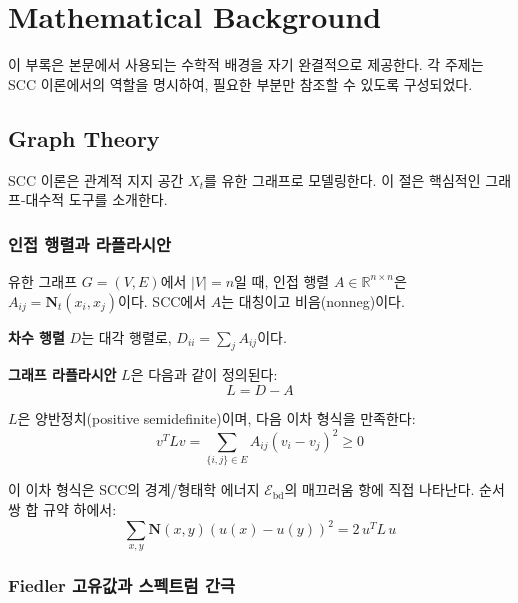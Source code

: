 
\chapter{Mathematical Background}
\label{app:math-background}

이 부록은 본문에서 사용되는 수학적 배경을 자기 완결적으로 제공한다. 각 주제는 SCC 이론에서의 역할을 명시하여, 필요한 부분만 참조할 수 있도록 구성되었다.


\section{Graph Theory}
\label{app:graph-theory}

SCC 이론은 관계적 지지 공간 $X_t$를 유한 그래프로 모델링한다. 이 절은 핵심적인 그래프-대수적 도구를 소개한다.


\subsection{인접 행렬과 라플라시안}

유한 그래프 $G = (V, E)$에서 $|V| = n$일 때, 인접 행렬 $A \in \mathbb{R}^{n \times n}$은 $A_{ij} = \mathbf{N}_t(x_i, x_j)$이다. SCC에서 $A$는 대칭이고 비음(nonneg)이다.

\textbf{차수 행렬} $D$는 대각 행렬로, $D_{ii} = \sum_j A_{ij}$이다.

\textbf{그래프 라플라시안} $L$은 다음과 같이 정의된다:
\begin{equation}
    L = D - A
    \label{eq:laplacian-def}
\end{equation}

$L$은 양반정치(positive semidefinite)이며, 다음 이차 형식을 만족한다:
\begin{equation}
    v^T L v = \sum_{\{i,j\} \in E} A_{ij}(v_i - v_j)^2 \geq 0
    \label{eq:laplacian-quadratic}
\end{equation}

이 이차 형식은 SCC의 경계/형태학 에너지 $\mathcal{E}_{\mathrm{bd}}$의 매끄러움 항에 직접 나타난다. 순서쌍 합 규약 하에서:
\begin{equation}
    \sum_{x,y} \mathbf{N}(x,y)(u(x) - u(y))^2 = 2\, u^T L\, u
    \label{eq:ordered-pair-laplacian}
\end{equation}


\subsection{Fiedler 고유값과 스펙트럼 간극}

